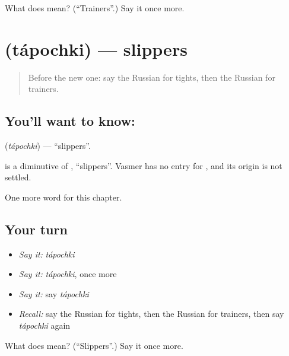 \begin{tcolorbox}[breakable,colback=teal!4,colframe=teal!35!black,title={Before you move on}]
What does  mean? (\textquotedblleft{}Trainers\textquotedblright{}.) Say it once more.
\end{tcolorbox}
\section[\texorpdfstring{\ru{тапочки} (tápochki)}{тапочки (tápochki)}]{ (tápochki) — slippers}

\label{lesson:RU-C162-tapochki}



\begin{quote}
Before the new one: say the Russian for tights, then the Russian for trainers.
\end{quote}

\subsection*{You'll want to know: }
\textbf{} (\emph{tápochki}) — \textquotedblleft{}slippers\textquotedblright{}.

\begin{cousinweb}
\textbf{} is a diminutive of \emph{}, \textquotedblleft{}slippers\textquotedblright{}. Vasmer has no entry for \emph{}, and its origin is not settled.
\end{cousinweb}

\begin{grammarlens}[title={What you've built}]
One more word for this chapter.
\end{grammarlens}

\subsection*{Your turn}
\begin{itemize}
\raggedright
  \item \emph{Say it:} \emph{tápochki}
  \item \emph{Say it:} \emph{tápochki}, once more
  \item \emph{Say it:} say \emph{tápochki}
  \item \emph{Recall:} say the Russian for tights, then the Russian for trainers, then say \emph{tápochki} again
\end{itemize}

\begin{tcolorbox}[breakable,colback=teal!4,colframe=teal!35!black,title={Before you move on}]
What does  mean? (\textquotedblleft{}Slippers\textquotedblright{}.) Say it once more.
\end{tcolorbox}
